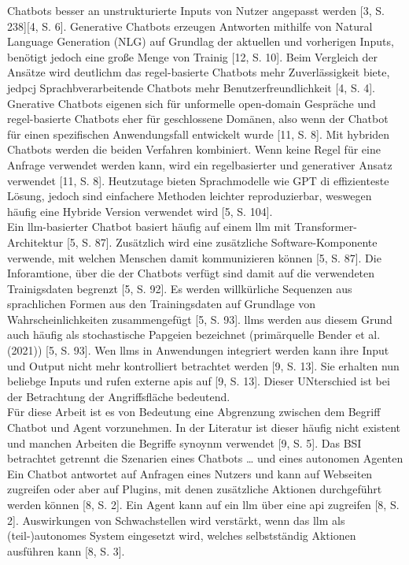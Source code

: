 Chatbots besser an unstrukturierte Inputs von Nutzer angepasst werden [3, S. 238][4, S. 6]. Generative Chatbots erzeugen Antworten mithilfe von Natural Language
Generation (NLG) auf Grundlag der aktuellen und vorherigen Inputs, benötigt jedoch eine große Menge von Trainig [12, S. 10]. Beim Vergleich der Ansätze wird 
deutlichm das regel-basierte Chatbots mehr Zuverlässigkeit biete, jedpcj Sprachbverarbeitende Chatbots mehr Benutzerfreundlichkeit [4, S. 4]. Gnerative Chatbots
eigenen sich für unformelle open-domain Gespräche und regel-basierte Chatbots eher für geschlossene Domänen, also wenn der Chatbot für einen spezifischen 
Anwendungsfall entwickelt wurde [11, S. 8]. Mit hybriden Chatbots werden die beiden Verfahren kombiniert. Wenn keine Regel für eine Anfrage verwendet werden kann, wird
ein regelbasierter und generativer Ansatz verwendet [11, S. 8]. Heutzutage bieten Sprachmodelle wie GPT di effizienteste Lösung, jedoch sind einfachere Methoden
leichter reproduzierbar, weswegen häufig eine Hybride Version verwendet wird [5, S. 104]. \\
Ein \ac{llm}-basierter Chatbot basiert häufig auf einem \ac{llm} mit Transformer-Architektur [5, S. 87]. Zusätzlich wird eine zusätzliche Software-Komponente
verwende, mit welchen Menschen damit kommunizieren können [5, S. 87]. Die Inforamtione, über die der Chatbots verfügt sind damit auf die verwendeten Trainigsdaten
begrenzt [5, S. 92]. Es werden willkürliche Sequenzen aus sprachlichen Formen aus den Trainingsdaten auf Grundlage von Wahrscheinlichkeiten zusammengefügt [5, S. 93].
\ac{llm}s werden aus diesem Grund auch häufig als stochastische Papgeien bezeichnet (primärquelle Bender et al. (2021)) [5, S. 93]. Wen \ac{llm}s in Anwendungen integriert werden kann ihre 
Input und Output nicht mehr kontrolliert betrachtet werden [9, S. 13]. Sie erhalten nun beliebge Inputs und rufen externe \ac{api}s auf [9, S. 13]. Dieser UNterschied
ist bei der Betrachtung der Angriffsfläche bedeutend. \\
Für diese Arbeit ist es von Bedeutung eine Abgrenzung zwischen dem Begriff Chatbot und Agent vorzunehmen. In der Literatur ist dieser häufig nicht existent und 
manchen Arbeiten die Begriffe synoynm verwendet [9, S. 5]. Das BSI betrachtet getrennt die Szenarien eines Chatbots … und eines autonomen Agenten
Ein Chatbot antwortet auf Anfragen eines Nutzers und kann auf Webseiten zugreifen oder aber auf Plugins, 
mit denen zusätzliche Aktionen durchgeführt werden können [8, S. 2]. Ein Agent kann auf ein \ac{llm} über eine \ac{api} zugreifen [8, S. 2].
Auswirkungen von Schwachstellen wird verstärkt, wenn das \ac{llm} als (teil-)autonomes System eingesetzt wird, welches selbstständig Aktionen ausführen kann [8, S. 3].
